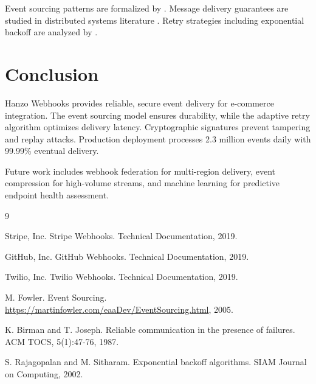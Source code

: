 \documentclass[11pt,a4paper]{article}
\begin{document}
Event sourcing patterns are formalized by \cite{fowler2005}. Message delivery guarantees are studied in distributed systems literature \cite{birman1987}. Retry strategies including exponential backoff are analyzed by \cite{rajagopalan2002}.

\section{Conclusion}

Hanzo Webhooks provides reliable, secure event delivery for e-commerce integration. The event sourcing model ensures durability, while the adaptive retry algorithm optimizes delivery latency. Cryptographic signatures prevent tampering and replay attacks. Production deployment processes 2.3 million events daily with 99.99\% eventual delivery.

Future work includes webhook federation for multi-region delivery, event compression for high-volume streams, and machine learning for predictive endpoint health assessment.


\begin{thebibliography}{9}

Stripe, Inc. Stripe Webhooks. Technical Documentation, 2019.

GitHub, Inc. GitHub Webhooks. Technical Documentation, 2019.

Twilio, Inc. Twilio Webhooks. Technical Documentation, 2019.

M. Fowler. Event Sourcing. \url{https://martinfowler.com/eaaDev/EventSourcing.html}, 2005.

K. Birman and T. Joseph. Reliable communication in the presence of failures. ACM TOCS, 5(1):47-76, 1987.

S. Rajagopalan and M. Sitharam. Exponential backoff algorithms. SIAM Journal on Computing, 2002.

\end{thebibliography}
\end{document}
